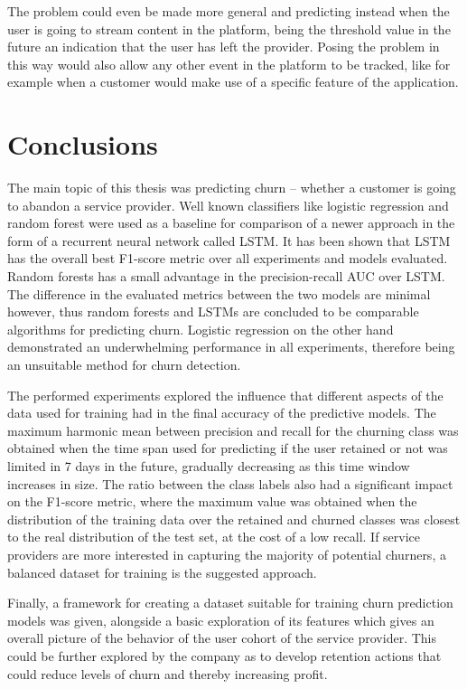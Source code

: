 \documentclass{kththesis}
\begin{document}
The problem could even be made more general and predicting instead when the user is going to stream content in the platform, being the threshold value in the future an indication that the user has left the provider. Posing the problem in this way would also allow any other event in the platform to be tracked, like for example when a customer would make use of a specific feature of the application. 


\chapter{Conclusions}
\label{cha:conclusion}

The main topic of this thesis was predicting churn -- whether a customer is going to abandon a service provider. Well known classifiers like logistic regression and random forest were used as a baseline for comparison of a newer approach in the form of a recurrent neural network called LSTM. It has been shown that LSTM has the overall best F1-score metric over all experiments and models evaluated. Random forests has a small advantage in the precision-recall AUC over LSTM. The difference in the evaluated metrics between the two models are minimal however, thus random forests and LSTMs are concluded to be comparable algorithms for predicting churn. Logistic regression on the other hand demonstrated an underwhelming performance in all experiments, therefore being an unsuitable method for churn detection. 

The performed experiments explored the influence that different aspects of the data used for training had in the final accuracy of the predictive models. The maximum harmonic mean between precision and recall for the churning class was obtained when the time span used for predicting if the user retained or not was limited in 7 days in the future, gradually decreasing as this time window increases in size. The ratio between the class labels also had a significant impact on the F1-score metric, where the maximum value was obtained when the distribution of the training data over the retained and churned classes was closest to the real distribution of the test set, at the cost of a low recall. If service providers are more interested in capturing the majority of potential churners, a balanced dataset for training is the suggested approach.

Finally, a framework for creating a dataset suitable for training churn prediction models was given, alongside a basic exploration of its features which gives an overall picture of the behavior of the user cohort of the service provider. This could be further explored by the company as to develop retention actions that could reduce levels of churn and thereby increasing profit.  
\end{document}
